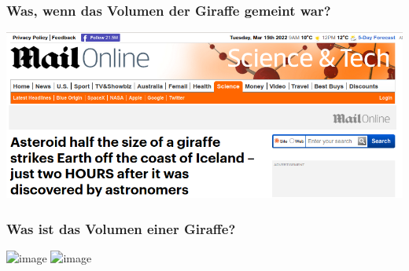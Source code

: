 \documentclass{beamer}
\begin{document}
\begin{frame}
\frametitle{Was, wenn das Volumen der Giraffe gemeint war?}

\begin{center}
\includegraphics[width=\textwidth]{giraffe.png}
\end{center}

\end{frame}



\begin{frame}
\end{frame}



\begin{frame}
\frametitle{Was ist das Volumen einer Giraffe?}

 
\begin{center}
\includegraphics<1>[width=0.6\textwidth]{giraffe_volumen_1.png}
\includegraphics<2>[width=0.6\textwidth]{giraffe_volumen_2.png}
\end{center}



\end{frame}
\end{document}

